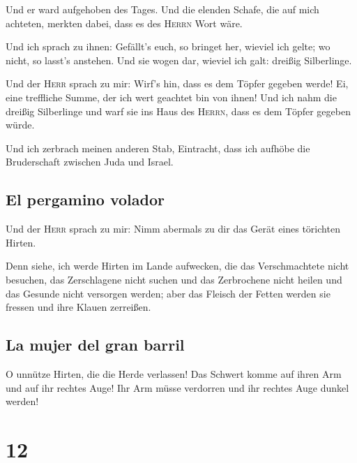  Und er ward aufgehoben des Tages. Und die elenden
Schafe, die auf mich achteten, merkten dabei, dass es des \textsc{Herrn}
Wort wäre.

 Und ich sprach zu ihnen: Gefällt's euch, so bringet her,
wieviel ich gelte; wo nicht, so lasst's anstehen. Und sie wogen dar,
wieviel ich galt: dreißig Silberlinge.

 Und der \textsc{Herr} sprach zu mir: Wirf's hin, dass es
dem Töpfer gegeben werde! Ei, eine treffliche Summe, der ich wert
geachtet bin von ihnen! Und ich nahm die dreißig Silberlinge und warf
sie ins Haus des \textsc{Herrn}, dass es dem Töpfer gegeben würde.

 Und ich zerbrach meinen anderen Stab, Eintracht, dass
ich aufhöbe die Bruderschaft zwischen Juda und Israel.

\hypertarget{el-pergamino-volador}{%
\subsection{El pergamino volador}\label{el-pergamino-volador}}

 Und der \textsc{Herr} sprach zu mir: Nimm abermals zu
dir das Gerät eines törichten Hirten.

 Denn siehe, ich werde Hirten im Lande aufwecken, die das
Verschmachtete nicht besuchen, das Zerschlagene nicht suchen und das
Zerbrochene nicht heilen und das Gesunde nicht versorgen werden; aber
das Fleisch der Fetten werden sie fressen und ihre Klauen zerreißen.

\hypertarget{la-mujer-del-gran-barril}{%
\subsection{La mujer del gran barril}\label{la-mujer-del-gran-barril}}

 O unnütze Hirten, die die Herde verlassen! Das Schwert
komme auf ihren Arm und auf ihr rechtes Auge! Ihr Arm müsse verdorren
und ihr rechtes Auge dunkel werden!

\hypertarget{section-11}{%
\section{12}\label{section-11}}

